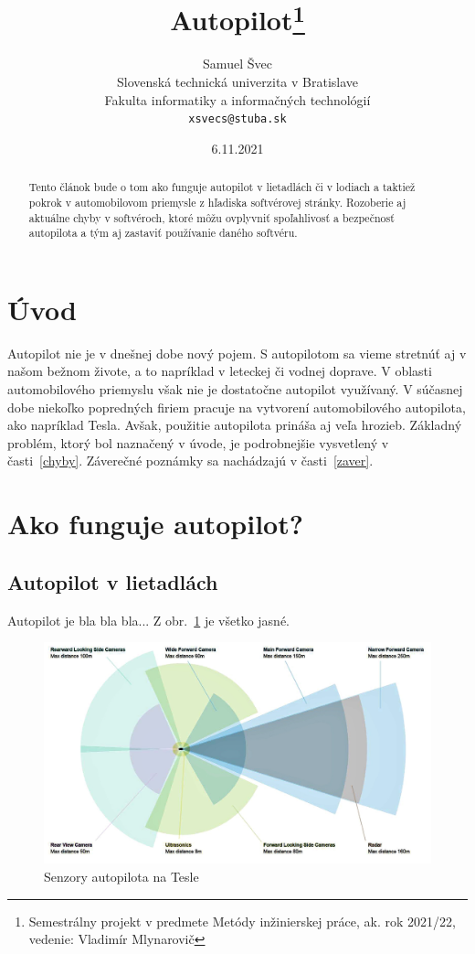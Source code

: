 \documentclass[10pt,twoside,slovak,a4paper]{article}
\title{Autopilot\thanks{Semestrálny projekt v predmete Metódy inžinierskej práce, ak. rok 2021/22, vedenie: Vladimír Mlynarovič}} %
\author{Samuel Švec\\[2pt]
	{\small Slovenská technická univerzita v Bratislave}\\
	{\small Fakulta informatiky a informačných technológií}\\
	{\small \texttt{xsvecs@stuba.sk}}
	}
\date{\small 6.11.2021} %
\begin{document}
\maketitle

\begin{abstract}
Tento článok bude o tom ako funguje autopilot v lietadlách či v lodiach a taktiež pokrok v automobilovom priemysle z hľadiska softvérovej stránky. Rozoberie aj aktuálne chyby v softvéroch, ktoré môžu ovplyvniť spoľahlivosť a bezpečnosť autopilota a tým aj zastaviť používanie daného softvéru.
\end{abstract}



\section{Úvod}
Autopilot nie je v dnešnej dobe nový pojem. S autopilotom sa vieme stretnúť aj v našom bežnom živote, a to napríklad v leteckej či vodnej doprave. V oblasti automobilového priemyslu však nie je dostatočne autopilot využívaný. V súčasnej dobe niekoľko popredných firiem pracuje na vytvorení automobilového autopilota, ako napríklad Tesla. Avšak, použitie autopilota prináša aj veľa hrozieb. Základný problém, ktorý bol naznačený v úvode, je podrobnejšie vysvetlený v časti~\ref{chyby}.
Záverečné poznámky sa nachádzajú v časti~\ref{zaver}.


\section{Ako funguje autopilot?} \label{nejaka}
\subsection{Autopilot v lietadlách} \label{ina:nejaka}

Autopilot je bla bla bla... Z obr.~\ref{f:sensors} je všetko jasné.  

\begin{figure}[tbh]
\centering
\includegraphics[scale=0.1]{sensors.jpg}
\caption{Senzory autopilota na Tesle}
\label{f:sensors}
\end{figure}
\end{document}
